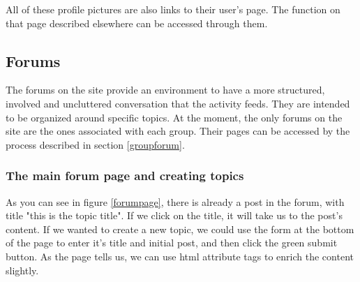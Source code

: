 \documentclass[10pt]{article}
\begin{document}
\begin{flushleft}
All of these profile pictures are also links to their user's page.  The function on that page described elsewhere can be accessed through them.
\end{flushleft}

\subsection{Forums} \label{Forums}
The forums on the site provide an environment to have a more structured, involved and uncluttered conversation that the activity feeds.  They are intended to be organized around specific topics.  At the moment, the only forums on the site are the ones associated with each group.  Their pages can be accessed by the process described in section \ref{groupforum}. 


\subsubsection{The main forum page and creating topics} \label{doggopost}
\begin{flushleft}
As you can see in figure \ref{forumpage}, there is already a post in the forum, with title "this is the topic title".  If we click on the title, it will take us to the post's content.  If we wanted to create a new topic, we could use the form at the bottom of the page to enter it's title and initial post, and then click the green submit button.  As the page tells us, we can use html attribute tags to enrich the content slightly.
\end{flushleft}
\end{document}
